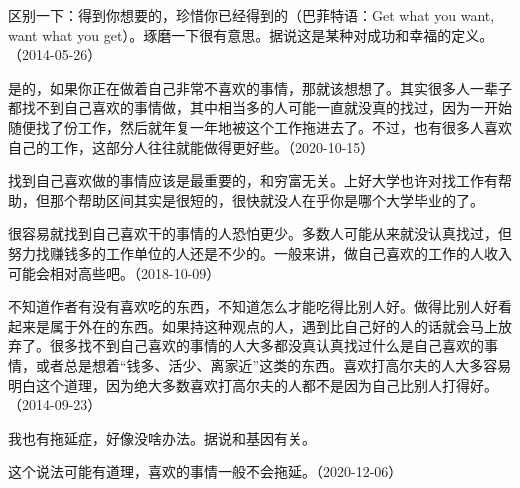 
区别一下：得到你想要的，珍惜你已经得到的（巴菲特语：Get what you want, want what you get）。琢磨一下很有意思。据说这是某种对成功和幸福的定义。（2014-05-26）


是的，如果你正在做着自己非常不喜欢的事情，那就该想想了。其实很多人一辈子都找不到自己喜欢的事情做，其中相当多的人可能一直就没真的找过，因为一开始随便找了份工作，然后就年复一年地被这个工作拖进去了。不过，也有很多人喜欢自己的工作，这部分人往往就能做得更好些。（2020-10-15）


找到自己喜欢做的事情应该是最重要的，和穷富无关。上好大学也许对找工作有帮助，但那个帮助区间其实是很短的，很快就没人在乎你是哪个大学毕业的了。


很容易就找到自己喜欢干的事情的人恐怕更少。多数人可能从来就没认真找过，但努力找赚钱多的工作单位的人还是不少的。一般来讲，做自己喜欢的工作的人收入可能会相对高些吧。（2018-10-09）


不知道作者有没有喜欢吃的东西，不知道怎么才能吃得比别人好。做得比别人好看起来是属于外在的东西。如果持这种观点的人，遇到比自己好的人的话就会马上放弃了。很多找不到自己喜欢的事情的人大多都没真认真找过什么是自己喜欢的事情，或者总是想着“钱多、活少、离家近”这类的东西。喜欢打高尔夫的人大多容易明白这个道理，因为绝大多数喜欢打高尔夫的人都不是因为自己比别人打得好。（2014-09-23）


我也有拖延症，好像没啥办法。据说和基因有关。


这个说法可能有道理，喜欢的事情一般不会拖延。（2020-12-06）


